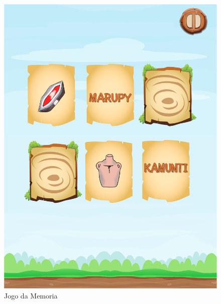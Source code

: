 \documentclass[12pt]{article}
\begin{document}
		\begin{figure}[!htb]
			\includegraphics[width=\linewidth]{img/memoryGame2.png}
			\caption{Jogo da Memoria}\label{fig:exampleFig6}
			\endminipage\hfill

\end{figure}
\end{document}
